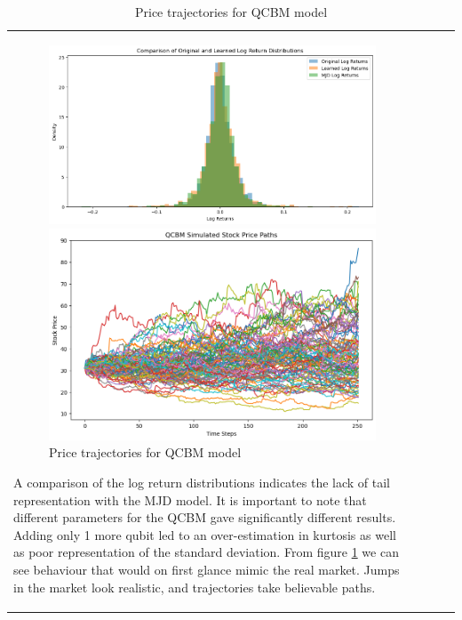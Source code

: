 \documentclass[12pt]{article}
\numberwithin{equation}{section}
\begin{document}
\begin{table}[h!]
\begin{tabular}{|l|c|c|c|}
\begin{figure}[h!]
\begin{minipage}{0.48\textwidth}
    \end{minipage}
\end{figure}
\begin{figure}[h!]
    \centering
    \begin{minipage}{0.48\textwidth}
        \centering
        \includegraphics[width=\linewidth]{compdists.png}
        \caption{Comparison of distributions}
        \label{fig:compdists}
    \end{minipage}
    \hfill
    \begin{minipage}{0.48\textwidth}
        \centering
        \includegraphics[width=\linewidth]{pricepath2.png}
        \caption{Price trajectories for QCBM model}
        \label{fig:pricepath}
    \end{minipage}
\end{figure}
A comparison of the log return distributions indicates the lack of tail representation 
with the MJD model. It is important to note that different parameters for the QCBM 
gave significantly different results. Adding only 1 more qubit led to an 
over-estimation in kurtosis as well as poor representation of the standard 
deviation. From figure \ref{fig:pricepath} we can see behaviour that would on 
first glance mimic the real market. Jumps in the market look realistic, and 
trajectories take believable paths. 

\end{tabular}
\end{table}
\end{document}
